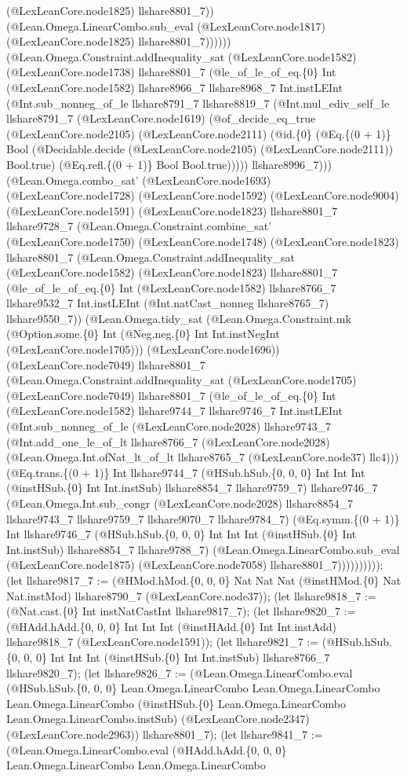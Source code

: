 \documentclass[11pt]{article}
\begin{document}
(@LexLeanCore.node1825) llshare8801\_7)) (@Lean.Omega.LinearCombo.sub\_eval (@LexLeanCore.node1817) (@LexLeanCore.node1825) llshare8801\_7)))))) (@Lean.Omega.Constraint.addInequality\_sat (@LexLeanCore.node1582) (@LexLeanCore.node1738) llshare8801\_7 (@le\_of\_le\_of\_eq.\{0\} Int (@LexLeanCore.node1582) llshare8966\_7 llshare8968\_7 Int.instLEInt (@Int.sub\_nonneg\_of\_le llshare8791\_7 llshare8819\_7 (@Int.mul\_ediv\_self\_le llshare8791\_7 (@LexLeanCore.node1619) (@of\_decide\_eq\_true (@LexLeanCore.node2105) (@LexLeanCore.node2111) (@id.\{0\} (@Eq.\{(0 + 1)\} Bool (@Decidable.decide (@LexLeanCore.node2105) (@LexLeanCore.node2111)) Bool.true) (@Eq.refl.\{(0 + 1)\} Bool Bool.true))))) llshare8996\_7))) (@Lean.Omega.combo\_sat' (@LexLeanCore.node1693) (@LexLeanCore.node1728) (@LexLeanCore.node1592) (@LexLeanCore.node9004) (@LexLeanCore.node1591) (@LexLeanCore.node1823) llshare8801\_7 llshare9728\_7 (@Lean.Omega.Constraint.combine\_sat' (@LexLeanCore.node1750) (@LexLeanCore.node1748) (@LexLeanCore.node1823) llshare8801\_7 (@Lean.Omega.Constraint.addInequality\_sat (@LexLeanCore.node1582) (@LexLeanCore.node1823) llshare8801\_7 (@le\_of\_le\_of\_eq.\{0\} Int (@LexLeanCore.node1582) llshare8766\_7 llshare9532\_7 Int.instLEInt (@Int.natCast\_nonneg llshare8765\_7) llshare9550\_7)) (@Lean.Omega.tidy\_sat (@Lean.Omega.Constraint.mk (@Option.some.\{0\} Int (@Neg.neg.\{0\} Int Int.instNegInt (@LexLeanCore.node1705))) (@LexLeanCore.node1696)) (@LexLeanCore.node7049) llshare8801\_7 (@Lean.Omega.Constraint.addInequality\_sat (@LexLeanCore.node1705) (@LexLeanCore.node7049) llshare8801\_7 (@le\_of\_le\_of\_eq.\{0\} Int (@LexLeanCore.node1582) llshare9744\_7 llshare9746\_7 Int.instLEInt (@Int.sub\_nonneg\_of\_le (@LexLeanCore.node2028) llshare9743\_7 (@Int.add\_one\_le\_of\_lt llshare8766\_7 (@LexLeanCore.node2028) (@Lean.Omega.Int.ofNat\_lt\_of\_lt llshare8765\_7 (@LexLeanCore.node37) llc4))) (@Eq.trans.\{(0 + 1)\} Int llshare9744\_7 (@HSub.hSub.\{0, 0, 0\} Int Int Int (@instHSub.\{0\} Int Int.instSub) llshare8854\_7 llshare9759\_7) llshare9746\_7 (@Lean.Omega.Int.sub\_congr (@LexLeanCore.node2028) llshare8854\_7 llshare9743\_7 llshare9759\_7 llshare9070\_7 llshare9784\_7) (@Eq.symm.\{(0 + 1)\} Int llshare9746\_7 (@HSub.hSub.\{0, 0, 0\} Int Int Int (@instHSub.\{0\} Int Int.instSub) llshare8854\_7 llshare9788\_7) (@Lean.Omega.LinearCombo.sub\_eval (@LexLeanCore.node1875) (@LexLeanCore.node7058) llshare8801\_7)))))))))); (let llshare9817\_7 := (@HMod.hMod.\{0, 0, 0\} Nat Nat Nat (@instHMod.\{0\} Nat Nat.instMod) llshare8790\_7 (@LexLeanCore.node37)); (let llshare9818\_7 := (@Nat.cast.\{0\} Int instNatCastInt llshare9817\_7); (let llshare9820\_7 := (@HAdd.hAdd.\{0, 0, 0\} Int Int Int (@instHAdd.\{0\} Int Int.instAdd) llshare9818\_7 (@LexLeanCore.node1591)); (let llshare9821\_7 := (@HSub.hSub.\{0, 0, 0\} Int Int Int (@instHSub.\{0\} Int Int.instSub) llshare8766\_7 llshare9820\_7); (let llshare9826\_7 := (@Lean.Omega.LinearCombo.eval (@HSub.hSub.\{0, 0, 0\} Lean.Omega.LinearCombo Lean.Omega.LinearCombo Lean.Omega.LinearCombo (@instHSub.\{0\} Lean.Omega.LinearCombo Lean.Omega.LinearCombo.instSub) (@LexLeanCore.node2347) (@LexLeanCore.node2963)) llshare8801\_7); (let llshare9841\_7 := (@Lean.Omega.LinearCombo.eval (@HAdd.hAdd.\{0, 0, 0\} Lean.Omega.LinearCombo Lean.Omega.LinearCombo 
\end{document}
